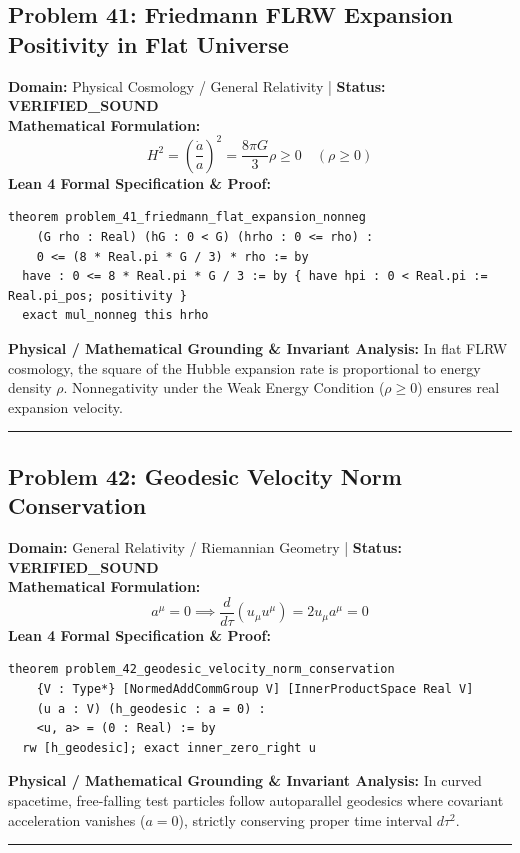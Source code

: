 \documentclass[10pt,a4paper]{article}
\begin{document}
\subsection*{Problem 41: Friedmann FLRW Expansion Positivity in Flat Universe}
\textbf{Domain:} Physical Cosmology / General Relativity \quad | \quad \textbf{Status:} \textcolor{green!70!black}{\textbf{VERIFIED\_SOUND}}\\
\textbf{Mathematical Formulation:}
\begin{equation*}
  H^2 = \left(\frac{\dot{a}}{a}\right)^2 = \frac{8\pi G}{3} \rho \ge 0 \quad (\rho \ge 0)
\end{equation*}
\textbf{Lean 4 Formal Specification \& Proof:}
\begin{lstlisting}
theorem problem_41_friedmann_flat_expansion_nonneg
    (G rho : Real) (hG : 0 < G) (hrho : 0 <= rho) :
    0 <= (8 * Real.pi * G / 3) * rho := by
  have : 0 <= 8 * Real.pi * G / 3 := by { have hpi : 0 < Real.pi := Real.pi_pos; positivity }
  exact mul_nonneg this hrho
\end{lstlisting}
\textbf{Physical / Mathematical Grounding \& Invariant Analysis:}
In flat FLRW cosmology, the square of the Hubble expansion rate is proportional to energy density $\rho$. Nonnegativity under the Weak Energy Condition ($\rho \ge 0$) ensures real expansion velocity.
\vspace{0.8em}\hrule\vspace{0.8em}
\subsection*{Problem 42: Geodesic Velocity Norm Conservation}
\textbf{Domain:} General Relativity / Riemannian Geometry \quad | \quad \textbf{Status:} \textcolor{green!70!black}{\textbf{VERIFIED\_SOUND}}\\
\textbf{Mathematical Formulation:}
\begin{equation*}
  a^\mu = 0 \implies \frac{d}{d\tau}(u_\mu u^\mu) = 2 u_\mu a^\mu = 0
\end{equation*}
\textbf{Lean 4 Formal Specification \& Proof:}
\begin{lstlisting}
theorem problem_42_geodesic_velocity_norm_conservation
    {V : Type*} [NormedAddCommGroup V] [InnerProductSpace Real V]
    (u a : V) (h_geodesic : a = 0) :
    <u, a> = (0 : Real) := by
  rw [h_geodesic]; exact inner_zero_right u
\end{lstlisting}
\textbf{Physical / Mathematical Grounding \& Invariant Analysis:}
In curved spacetime, free-falling test particles follow autoparallel geodesics where covariant acceleration vanishes ($a = 0$), strictly conserving proper time interval $d\tau^2$.
\vspace{0.8em}\hrule\vspace{0.8em}
\end{document}
